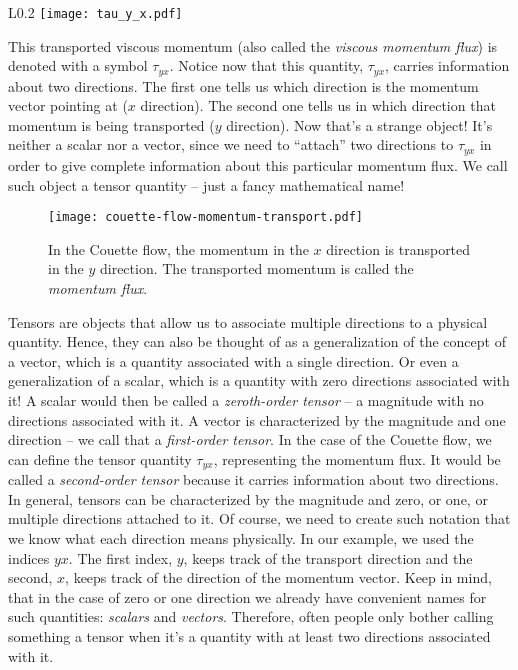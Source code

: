 \documentclass[10pt,twocolumn]{article}
\begin{document}
\begin{wrapfigure}{L}{0.2\textwidth}
\centering\texttt{[image: tau\_y\_x.pdf]}
\label{fig:tau_y_x}
\end{wrapfigure}
This transported viscous momentum (also called the \textit{viscous momentum flux}) is denoted with a symbol $\tau_{yx}$. Notice now that this quantity, $\tau_{yx}$, carries information about two directions. The first one tells us which direction is the momentum vector pointing at ($x$ direction). The second one tells us in which direction that momentum is being transported ($y$ direction). Now that's a strange object! It's neither a scalar nor a vector, since we need to ``attach'' two directions to $\tau_{yx}$ in order to give complete information about this particular momentum flux. We call such object a tensor quantity -- just a fancy mathematical name!
\begin{figure}[t!]
\centering\texttt{[image: couette-flow-momentum-transport.pdf]}
\caption{In the Couette flow, the momentum in the $x$ direction is transported in the $y$ direction. The transported momentum is called the \textit{momentum flux}.}
\label{fig:couette-flow-momentum-transport}
\end{figure}

Tensors are objects that allow us to associate multiple directions to a physical quantity. Hence, they can also be thought of as a generalization of the concept of a vector, which is a quantity associated with a single direction. Or even a generalization of a scalar, which is a quantity with zero directions associated with it! A scalar would then be called a \textit{zeroth-order tensor} -- a magnitude with no directions associated with it. A vector is characterized by the magnitude and one direction -- we call that a \textit{first-order tensor}. In the case of the Couette flow, we can define the tensor quantity $\tau_{yx}$, representing the momentum flux. It would be called a \textit{second-order tensor} because it carries information about two directions. In general, tensors can be characterized by the magnitude and zero, or one, or multiple directions attached to it. Of course, we need to create such notation that we know what each direction means physically. In our example, we used the indices $yx$. The first index, $y$, keeps track of the transport direction and the second, $x$, keeps track of the direction of the momentum vector. Keep in mind, that in the case of zero or one direction we already have convenient names for such quantities: \textit{scalars} and \textit{vectors}. Therefore, often people only bother calling something a tensor when it's a quantity with at least two directions associated with it.
\end{document}
